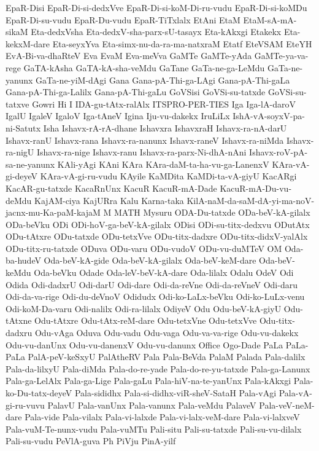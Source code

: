 {EpaR-Disi
EpaR-Di-si-dedxVve
EpaR-Di-si-koM-Di-ru-vudu
EpaR-Di-si-koMDu
EpaR-Di-su-vudu
EpaR-Du-vudu
EpaR-TiTxlalx
EtAni
EtaM
EtaM-sA-mA-sikaM
Eta-dedxVsha
Eta-dedxV-sha-parx-sU-tasayx
Eta-kAkxgi
Etakekx
Eta-kekxM-dare
Eta-seyxYva
Eta-simx-nu-da-ra-ma-natxraM
Etatf
EteVSAM
EteYH
EvA-Bi-va-dhaRteV
Eva
EvaM
Eva-meVva
GaMTe
GaMTe-yAda
GaMTe-ya-va-rege
GaTA-kAsha
GaTA-kA-sha-veMdu
GaTane
GaTa-ne-ga-LeMdu
GaTa-ne-yanunx
GaTa-ne-yiM-dAgi
Gana
Gana-pA-Thi-ga-LAgi
Gana-pA-Thi-gaLa
Gana-pA-Thi-ga-Lalilx
Gana-pA-Thi-gaLu
GoVSisi
GoVSi-su-tatxde
GoVSi-su-tatxve
Gowri
Hi
I
IDA-gu-tAtx-ralAlx
ITSPRO-PER-TIES
Iga
Iga-lA-daroV
IgalU
IgaleV
IgaloV
Iga-tAneV
Igina
Iju-vu-dakekx
IruLiLx
IshA-vA-soyxV-pa-ni-Satutx
Isha
Ishavx-rA-rA-dhane
Ishavxra
IshavxraH
Ishavx-ra-nA-darU
Ishavx-ranU
Ishavx-rana
Ishavx-ra-nanunx
Ishavx-raneV
Ishavx-ra-niMda
Ishavx-ra-nigU
Ishavx-ra-nige
Ishavx-ranu
Ishavx-ra-parx-Ni-dhA-nAni
Ishavx-roV-pA-sa-ne-yanunx
KAli-yAgi
KAni
KAra
KAra-daM-ta-ha-vu-ga-LanenxV
KAra-vA-gi-deyeV
KAra-vA-gi-ru-vudu
KAyile
KaMDita
KaMDi-ta-vA-giyU
KacARgi
KacAR-gu-tatxde
KacaRnUnx
KacuR
KacuR-mA-Dade
KacuR-mA-Du-vu-deMdu
KajAM-ciya
KajURra
Kalu
Karna-taka
KilA-naM-da-saM-dA-yi-ma-noV-jacnx-mu-Ka-paM-kajaM
M
MATH
Mysuru
ODA-Du-tatxde
ODa-beV-kA-gilalx
ODa-beVku
ODi
ODi-hoV-ga-beV-kA-gilalx
ODisi
ODi-su-titx-dedxvu
ODutAtx
ODu-tAtxre
ODu-tatxde
ODu-tetxVve
ODu-titx-dadxre
ODu-titx-didxV-yalAlx
ODu-titx-ru-tatxde
ODuva
ODu-varu
ODu-vudoV
ODu-vu-duMTeV
OM
Oda-ba-hudeV
Oda-beV-kA-gide
Oda-beV-kA-gilalx
Oda-beV-keM-dare
Oda-beV-keMdu
Oda-beVku
Odade
Oda-leV-beV-kA-dare
Oda-lilalx
Odalu
OdeV
Odi
Odida
Odi-dadxrU
Odi-darU
Odi-dare
Odi-da-reVne
Odi-da-reVneV
Odi-daru
Odi-da-va-rige
Odi-du-deVnoV
Odidudx
Odi-ko-LaLx-beVku
Odi-ko-LuLx-venu
Odi-koM-Da-varu
Odi-nalilx
Odi-ra-lilalx
OdiyeV
Odu
Odu-beV-kA-giyU
Odu-tAtxne
Odu-tAtxre
Odu-tAtx-reM-dare
Odu-tetxVne
Odu-tetxVve
Odu-titx-dadxru
Odu-vAga
Oduva
Odu-vadu
Odu-vaga
Odu-va-va-rige
Odu-vu-dakekx
Odu-vu-danUnx
Odu-vu-danenxV
Odu-vu-danunx
Office
Ogo-Dade
PaLa
PaLa-PaLa
PalA-peV-keSxyU
PalAtheRV
Pala
Pala-BeVda
PalaM
Palada
Pala-dalilx
Pala-da-lilxyU
Pala-diMda
Pala-do-re-yade
Pala-do-re-yu-tatxde
Pala-ga-Lanunx
Pala-ga-LelAlx
Pala-ga-Lige
Pala-gaLu
Pala-hiV-na-te-yanUnx
Pala-kAkxgi
Pala-ko-Du-tatx-deyeV
Pala-sididhx
Pala-si-didhx-viR-sheV-SataH
Pala-vAgi
Pala-vA-gi-ru-vuvu
PalavU
Pala-vanUnx
Pala-vanunx
Pala-veMdu
PalaveV
Pala-veV-neM-dare
Pala-vide
Pala-vilalx
Pala-vi-lalxde
Pala-vi-lalx-veM-dare
Pala-vi-lalxveV
Pala-vuM-Te-nunx-vudu
Pala-vuMTu
Pali-situ
Pali-su-tatxde
Pali-su-vu-dilalx
Pali-su-vudu
PeVlA-guva
Ph
PiVju
PinA-yilf
}
